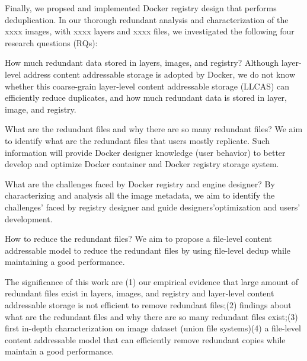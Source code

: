 Finally, we propsed and implemented Docker registry design that performs
deduplication.
%
In our thorough redundant analysis and characterization of the xxxx images,
with xxxx layers and xxxx files, we investigated the following four research
questions (RQs):
%
\begin{compactitemize}
%
\item How much redundant data stored in layers, images, and registry? Although
layer-level address content addressable storage is adopted by Docker, we do not
know whether  this coarse-grain layer-level content addressable storage (LLCAS)
can efficiently reduce duplicates, and how much redundant data is stored in
layer, image, and registry.
%
\item What are the redundant files and why there are so many redundant files?
We aim to identify what are the redundant files that users mostly replicate.
%
Such information will provide Docker designer knowledge (user behavior) to
better develop and optimize Docker container and Docker registry storage
system.
%
\item What are the challenges faced by Docker registry and engine designer? By
characterizing and analysis all the image metadata, we aim to identify the
challenges' faced by registry designer and guide designers'optimization and
users' development.
%
\item How to reduce the redundant files? We aim to propose a file-level content
addressable model to reduce the redundant files by using file-level dedup while
maintaining a good performance.
%
\end{compactitemize}

The significance of this work are (1) our empirical evidence that large amount
of redundant files exist in layers, images, and registry and layer-level
content addressable storage is not efficient to remove redundant files;(2)
findings about what are the redundant files and why there are so many redundant
files exist;(3) first in-depth characterization on image dataset (union file
systems)(4) a file-level content addressable model that can efficiently remove
redundant copies while maintain a good performance.


